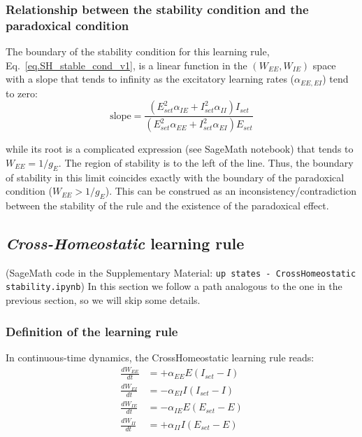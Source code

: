 \documentclass[
twocolumn,
]{article}
\newcommand{\EE}{\mathit{EE}}
\newcommand{\EI}{\mathit{EI}}
\newcommand{\IE}{\mathit{IE}}
\newcommand{\II}{\mathit{II}}
\newcommand{\set}{\mathit{set}}
\begin{document}
\subsubsection{Relationship between the stability condition and the paradoxical condition}

The boundary of the stability condition for this learning rule, Eq.\ \ref{eq.SH_stable_cond_v1}, is a linear function in the $(W_{\EE},W_{\IE})$ space with a slope that tends to infinity as the excitatory learning rates ($\alpha_{\EE,\EI}$) tend to zero:
\begin{displaymath}
\mbox{slope} = \frac{(E_{\set}^2 \alpha_{\IE} + I_{\set}^2\alpha_{\II})I_{\set}}{(E_{\set}^2\alpha_{\EE} + I_{\set}^2\alpha_{\EI})E_{\set}}
\end{displaymath}

\noindent while its root is a complicated expression (see SageMath notebook) that tends to $W_{\EE} = 1/g_E$. The region of stability is to the left of the line. Thus, the boundary of stability in this limit coincides exactly with the boundary of the paradoxical condition ($W_{\EE}>1/g_E$). This can be construed as an inconsistency/contradiction between the stability of the rule and the existence of the paradoxical effect.





\subsection{{\em Cross-Homeostatic} learning rule}
\label{sec.CH_details}

(SageMath code in the Supplementary Material: {\tt up states - CrossHomeostatic stability.ipynb})
In this section we follow a path analogous to the one in the previous section, so we will skip some details.


\subsubsection{Definition of the learning rule}

In continuous-time dynamics, the CrossHomeostatic learning rule reads:
\begin{equation}
\begin{aligned}
\frac{dW_{\EE}}{dt} & = +\alpha_{\EE} E (I_{\set} - I) \\
\frac{dW_{\EI}}{dt} & = -\alpha_{\EI} I (I_{\set} - I) \\
\frac{dW_{\IE}}{dt} & = -\alpha_{\IE} E (E_{\set} - E) \\
\frac{dW_{\II}}{dt} & = +\alpha_{\II} I (E_{\set} - E)
\end{aligned}
\label{eq.CH_equation}
\end{equation}
\end{document}
